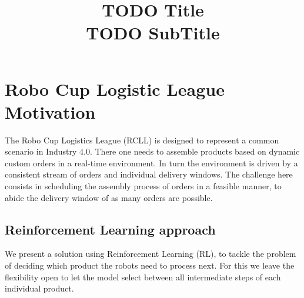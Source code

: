 \documentclass[runningheads,envcountsect]{llncs}
\title{{\huge TODO Title}\\{\LARGE \vspace{4pt} TODO SubTitle}}
\author{}
\institute{}
\begin{document}
\maketitle

\section{Robo Cup Logistic League Motivation}
The Robo Cup Logistics League (RCLL) is designed to represent a common scenario in Industry $4.0$. There one needs to assemble products based on dynamic custom orders in a real-time environment. In turn the environment is driven by a consistent stream of orders and individual delivery windows. The challenge here consists in scheduling the assembly process of orders in a feasible manner, to abide the delivery window of as many orders are possible.

\subsection{Reinforcement Learning approach}
We present a solution using Reinforcement Learning (RL), to tackle the problem of deciding which product the robots need to process next. For this we leave the flexibility open to let the model select between all intermediate steps of each individual product.


\vspace{24pt}



\end{document}
